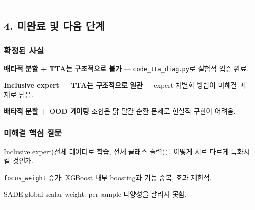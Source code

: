 \medskip\hrule\medskip
\subsection{4. 미완료 및 다음 단계}
\subsubsection{확정된 사실}
\par\noindent \textbullet\enspace \textbf{배타적 분할 +\allowbreak{} TTA는 구조적으로 불가} — \texttt{code\_\allowbreak{}\allowbreak{}tta\allowbreak{}\_\allowbreak{}\allowbreak{}diag.\allowbreak{}py\allowbreak{}}로 실험적 입증 완료.


\par\noindent \textbullet\enspace \textbf{Inclusive expert +\allowbreak{} TTA는 구조적으로 일관} — expert 차별화 방법이 미해결 과제로 남음.


\par\noindent \textbullet\enspace \textbf{배타적 분할 +\allowbreak{} OOD 게이팅} 조합은 닭-달걀 순환 문제로 현실적 구현이 어려움.


\subsubsection{미해결 핵심 질문}
Inclusive expert(전체 데이터로 학습, 전체 클래스 출력)를 어떻게 서로 다르게 특화시킬 것인가.

\par\noindent \textbullet\enspace \texttt{focus\_\allowbreak{}\allowbreak{}we\allowbreak{}ight} 증가: XGBoost 내부 boosting과 기능 중복, 효과 제한적.


\par\noindent \textbullet\enspace SADE global scalar weight: per-sample 다양성을 살리지 못함.



\medskip\hrule\medskip
